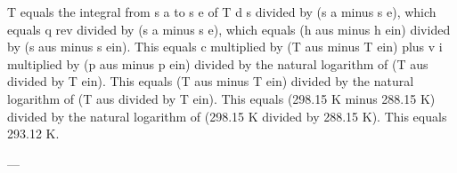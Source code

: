 T equals the integral from s a to s e of T d s divided by (s a minus s e), which equals q rev divided by (s a minus s e), which equals (h aus minus h ein) divided by (s aus minus s ein).  
This equals c multiplied by (T aus minus T ein) plus v i multiplied by (p aus minus p ein) divided by the natural logarithm of (T aus divided by T ein).  
This equals (T aus minus T ein) divided by the natural logarithm of (T aus divided by T ein).  
This equals (298.15 K minus 288.15 K) divided by the natural logarithm of (298.15 K divided by 288.15 K).  
This equals 293.12 K.

---